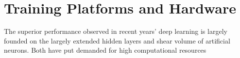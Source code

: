 \section{Training Platforms and Hardware}
The superior performance observed in recent years' deep learning is largely founded on the largely extended hidden layers and shear volume of artificial neurons. Both have put demanded for high computational resources 